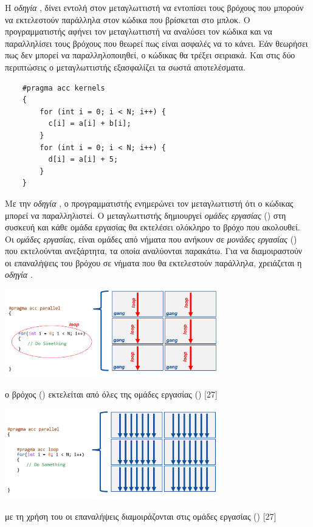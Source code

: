 Η \textit{οδηγία} , δίνει εντολή στον μεταγλωττιστή να εντοπίσει τους βρόχους που μπορούν να εκτελεστούν παράλληλα στον κώδικα που βρίσκεται στο μπλοκ. Ο προγραμματιστής αφήνει τον μεταγλωττιστή να αναλύσει τον κώδικα και να παραλληλίσει τους βρόχους που θεωρεί πως είναι ασφαλές να το κάνει. Εάν θεωρήσει πως δεν μπορεί να παραλληλοποιηθεί, ο κώδικας θα τρέξει σειριακά. Και στις δύο περιπτώσεις ο μεταγλωττιστής εξασφαλίζει τα σωστά αποτελέσματα.

\begin{verbatim}
    #pragma acc kernels
    {
        for (int i = 0; i < N; i++) {
          c[i] = a[i] + b[i];
        }
        for (int i = 0; i < N; i++) {
          d[i] = a[i] + 5;
        }
    }
\end{verbatim}

Με την \textit{οδηγία} , ο προγραμματιστής ενημερώνει τον μεταγλωττιστή ότι ο κώδικας μπορεί να παραλληλιστεί. Ο μεταγλωττιστής δημιουργεί \textit{ομάδες εργασίας} () στη συσκευή και κάθε ομάδα εργασίας θα εκτελέσει ολόκληρο το βρόχο που ακολουθεί. Οι \textit{ομάδες εργασίας}, είναι ομάδες από νήματα που ανήκουν σε \textit{μονάδες εργασίας} () που εκτελούνται ανεξάρτητα, τα οποία αναλύονται παρακάτω. Για να διαμοιραστούν οι επαναλήψεις του βρόχου σε νήματα που θα εκτελεστούν παράλληλα, χρειάζεται η \textit{οδηγία} . 
 
\begin{Illustration}[!h] 
	\centering
	\includegraphics[width=0.7\textwidth]{images/image056.png} 
	\caption{ο βρόχος () εκτελείται από όλες της ομάδες εργασίας () [27]}
	\label{image-3.13}
\end{Illustration}

 
\begin{Illustration}[!h] 
	\centering
	\includegraphics[width=0.7\textwidth]{images/image057.png} 
	\caption{με τη χρήση του  οι επαναλήψεις διαμοιράζονται στις ομάδες εργασίας () [27]}
	\label{image-3.14}
\end{Illustration}


